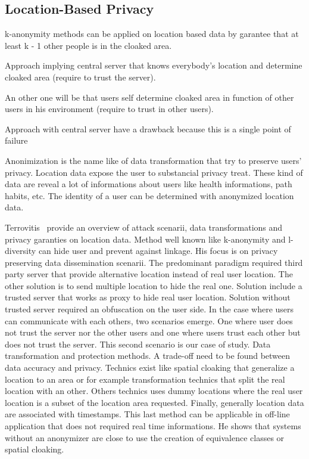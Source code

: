 
\subsection{Location-Based Privacy}


k-anonymity methods can be applied on location based data by garantee that at least k - 1 other people is in the cloaked area.

Approach implying central server that knows everybody's location and determine cloaked area (require to trust the server).

An other one will be that users self determine cloaked area in function of other users in his environment (require to trust in other users).

Approach with central server have a drawback because this is a single point of failure

Anonimization is the name like of data transformation that try to preserve users' privacy.
Location data expose the user to substancial privacy treat.
These kind of data are reveal a lot of informations about users like health informations, path habits, etc.
The identity of a user can be determined with anonymized location data.

Terrovitis~\cite{DBLP:journals/sigkdd/Terrovitis11} provide an overview of attack scenarii, data transformations and privacy garanties on location data.
Method well known like k-anonymity and l-diversity can hide user and prevent against linkage.
His focus is on privacy preserving data dissemination scenarii.
The predominant paradigm required third party server that provide alternative location instead of real user location.
The other solution is to send multiple location to hide the real one.
Solution include a trusted server that works as proxy to hide real user location.
Solution without trusted server required an obfuscation on the user side.
In the case where users can communicate with each others, two scenarios emerge. One where user does not trust the server nor the other users and one where users trust each other but does not trust the server.
This second scenario is our case of study.
Data transformation and protection methods. 
A trade-off need to be found between data accuracy and privacy.
Technics exist like spatial cloaking that generalize a location to an area or for example transformation technics that split the real location with an other.
Others technics uses dummy locations where the real user location is a subset of the location area requested.
Finally, generally location data are associated with timestamps.
This last method can be applicable in off-line application that does not required real time informations.
He shows that systems without an anonymizer are close to use the creation of equivalence classes or spatial cloaking.

